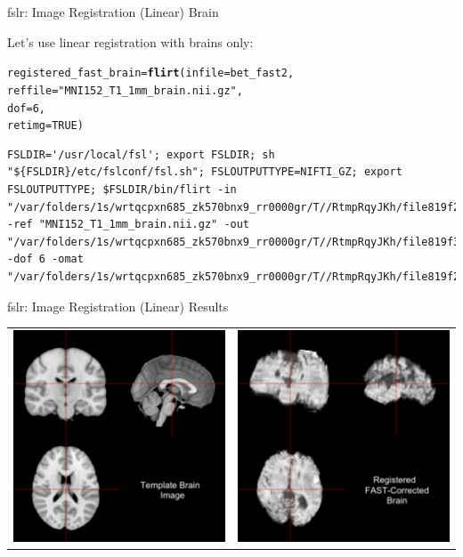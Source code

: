 \documentclass[11pt]{beamer}\usepackage[]{graphicx}\usepackage[]{color}
\makeatletter
\newcommand{\hlnum}[1]{\textcolor[rgb]{0.686,0.059,0.569}{#1}}%
\newcommand{\hlstr}[1]{\textcolor[rgb]{0.192,0.494,0.8}{#1}}%
\newcommand{\hlstd}[1]{\textcolor[rgb]{0.345,0.345,0.345}{#1}}%
\newcommand{\hlkwb}[1]{\textcolor[rgb]{0.69,0.353,0.396}{#1}}%
\newcommand{\hlkwc}[1]{\textcolor[rgb]{0.333,0.667,0.333}{#1}}%
\newcommand{\hlkwd}[1]{\textcolor[rgb]{0.737,0.353,0.396}{\textbf{#1}}}%
\newenvironment{kframe}{%
 \def\at@end@of@kframe{}%
 \ifinner\ifhmode%
  \def\at@end@of@kframe{\end{minipage}}%
  \begin{minipage}{\columnwidth}%
 \fi\fi%
 \def\FrameCommand##1{\hskip\@totalleftmargin \hskip-\fboxsep
 \colorbox{shadecolor}{##1}\hskip-\fboxsep
     \hskip-\linewidth \hskip-\@totalleftmargin \hskip\columnwidth}%
 \MakeFramed {\advance\hsize-\width
   \@totalleftmargin\z@ \linewidth\hsize
   \@setminipage}}%
 {\par\unskip\endMakeFramed%
 \at@end@of@kframe}
\newenvironment{knitrout}{}{} %
\makeatother
\begin{document}
\begin{frame}[fragile]{fslr: Image Registration (Linear) Brain}

Let's use linear registration with brains only:
\begin{knitrout}
\color{fgcolor}\begin{kframe}
\begin{alltt}
\hlstd{registered_fast_brain} \hlkwb{=} \hlkwd{flirt}\hlstd{(}\hlkwc{infile}\hlstd{=bet_fast2,}
  \hlkwc{reffile} \hlstd{=} \hlstr{"MNI152_T1_1mm_brain.nii.gz"}\hlstd{,}
        \hlkwc{dof} \hlstd{=} \hlnum{6}\hlstd{,}
        \hlkwc{retimg} \hlstd{=} \hlnum{TRUE}\hlstd{)}
\end{alltt}
\begin{verbatim}
FSLDIR='/usr/local/fsl'; export FSLDIR; sh "${FSLDIR}/etc/fslconf/fsl.sh"; FSLOUTPUTTYPE=NIFTI_GZ; export FSLOUTPUTTYPE; $FSLDIR/bin/flirt -in "/var/folders/1s/wrtqcpxn685_zk570bnx9_rr0000gr/T//RtmpRqyJKh/file819f2085a79b.nii.gz" -ref "MNI152_T1_1mm_brain.nii.gz" -out "/var/folders/1s/wrtqcpxn685_zk570bnx9_rr0000gr/T//RtmpRqyJKh/file819f3d68a284" -dof 6 -omat "/var/folders/1s/wrtqcpxn685_zk570bnx9_rr0000gr/T//RtmpRqyJKh/file819f26bec1cb.mat"  
\end{verbatim}
\end{kframe}
\end{knitrout}
\end{frame}




\begin{frame}[fragile]{fslr: Image Registration (Linear) Results}

\begin{tabular}{cc}
\includegraphics[width=0.5\linewidth]{Template_Brain.png} & \includegraphics[width=0.5\linewidth]{FLIRT_Reg_Image_Brain.png}
\end{tabular}

\end{frame}
\end{document}
